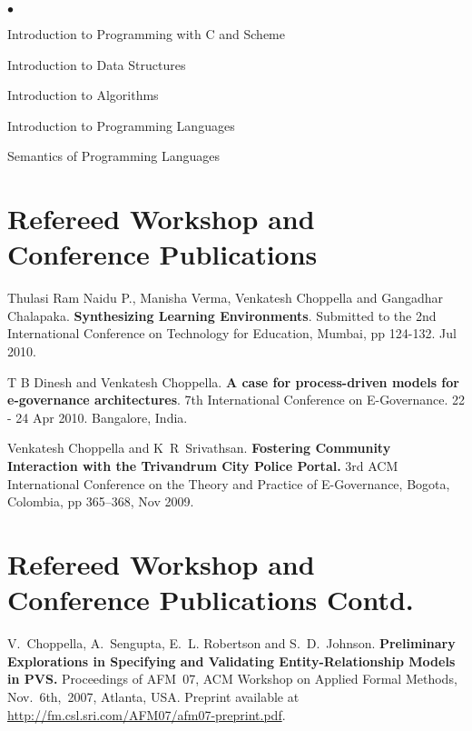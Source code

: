 \documentclass[11pt,margin,line]{res}
\newenvironment{list2}{
  \begin{list}{$\bullet$}{%
      \setlength{\itemsep}{0in}
      \setlength{\parsep}{0in} \setlength{\parskip}{0in}
      \setlength{\topsep}{0in} \setlength{\partopsep}{0in} 
      \setlength{\leftmargin}{0.2in}}}{\end{list}}
\begin{document}
\begin{resume}

\vspace*{.05in}  
\begin{list2}
\item Introduction to Programming with C and Scheme
\item Introduction to Data Structures
\item Introduction to Algorithms
\item Introduction to Programming Languages 
\item Semantics of Programming Languages
\end{list2}



\section{\sc Refereed Workshop and Conference Publications}

Thulasi Ram Naidu P., Manisha Verma, Venkatesh Choppella and
Gangadhar Chalapaka.  {\bf Synthesizing Learning
  Environments}.  Submitted to the 2nd International
Conference on Technology for Education, Mumbai, pp 124-132.
Jul 2010.

T B Dinesh and Venkatesh Choppella.  {\bf A case for
  process-driven models for e-governance architectures}.
7th International Conference on E-Governance.  22 - 24
Apr 2010.  Bangalore, India.  

Venkatesh Choppella and K~R~Srivathsan.  {\bf Fostering
  Community Interaction with the Trivandrum City Police
  Portal.}  3rd ACM International Conference on the Theory
and Practice of E-Governance, Bogota, Colombia, pp 365--368,
Nov 2009.

\newpage

\section{\sc Refereed Workshop and Conference Publications Contd.}

V.~Choppella, A.~Sengupta, E.~L. Robertson and
S.~D.~Johnson.  {\bf Preliminary Explorations in Specifying
  and Validating Entity-Relationship Models in PVS.}
Proceedings of AFM~07, ACM Workshop on Applied Formal
Methods, Nov.~6th,~2007, Atlanta, USA.  Preprint available
at \url{http://fm.csl.sri.com/AFM07/afm07-preprint.pdf}.


\end{resume}
\end{document}
